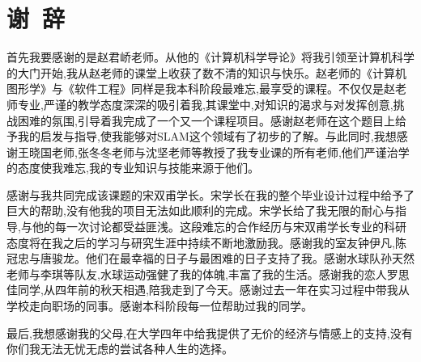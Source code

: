 \section*{谢\ 辞}

首先我要感谢的是赵君峤老师。从他的《计算机科学导论》将我引领至计算机科学的大门开始,我从赵老师的课堂上收获了数不清的知识与快乐。赵老师的《计算机图形学》与《软件工程》同样是我本科阶段最难忘,最享受的课程。不仅仅是赵老师专业,严谨的教学态度深深的吸引着我,其课堂中,对知识的渴求与对发挥创意,挑战困难的氛围,引导着我完成了一个又一个课程项目。感谢赵老师在这个题目上给予我的启发与指导,使我能够对SLAM这个领域有了初步的了解。与此同时,我想感谢王晓国老师,张冬冬老师与沈坚老师等教授了我专业课的所有老师,他们严谨治学的态度使我难忘,我的专业知识与技能来源于他们。

感谢与我共同完成该课题的宋双甫学长。宋学长在我的整个毕业设计过程中给予了巨大的帮助,没有他我的项目无法如此顺利的完成。宋学长给了我无限的耐心与指导,与他的每一次讨论都受益匪浅。这段难忘的合作经历与宋双甫学长专业的科研态度将在我之后的学习与研究生涯中持续不断地激励我。感谢我的室友钟伊凡,陈冠忠与唐骏龙。他们在最幸福的日子与最困难的日子支持了我。感谢水球队孙天然老师与李琪等队友,水球运动强健了我的体魄,丰富了我的生活。感谢我的恋人罗思佳同学,从四年前的秋天相遇,陪我走到了今天。感谢过去一年在实习过程中带我从学校走向职场的同事。感谢本科阶段每一位帮助过我的同学。

最后,我想感谢我的父母,在大学四年中给我提供了无价的经济与情感上的支持,没有你们我无法无忧无虑的尝试各种人生的选择。